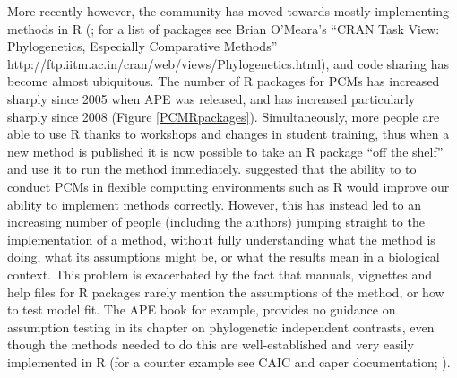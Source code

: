 \documentclass[a4paper,12pt]{article}
\begin{document}
    More recently however, the community has moved towards mostly implementing methods in R (\citealp{R-Core-Team:2014aa}; for a list of packages see Brian O'Meara's ``CRAN Task View: Phylogenetics, Especially Comparative Methods'' http://ftp.iitm.ac.in/cran/web/views/Phylogenetics.html), and code sharing has become almost ubiquitous. 
    The number of R packages for PCMs has increased sharply since 2005 when APE \citep{Paradis:2004aa} was released, and has increased particularly sharply since 2008 (Figure \ref{PCMRpackages}).
    Simultaneously, more people are able to use R thanks to workshops and changes in student training, thus when a new method is published it is now possible to take an R package ``off the shelf'' and use it to run the method immediately.
    \citet{freckleton2009seven} suggested that the ability to to conduct PCMs in flexible computing environments such as R would improve our ability to implement methods correctly. 
    However, this has instead led to an increasing number of people (including the authors) jumping straight to the implementation of a method, without fully understanding what the method is doing, what its assumptions might be, or what the results mean in a biological context.
    This problem is exacerbated by the fact that manuals, vignettes and help files for R packages rarely mention the assumptions of the method, or how to test model fit. 
    The APE book \citep{paradis2011analysis} for example, provides no guidance on assumption testing in its chapter on phylogenetic independent contrasts, even though the methods needed to do this are well-established and very easily implemented in R (for a counter example see CAIC and caper documentation; \citealp{purvis1995comparative,Orme:2013aa}).\\
    
\end{document}
